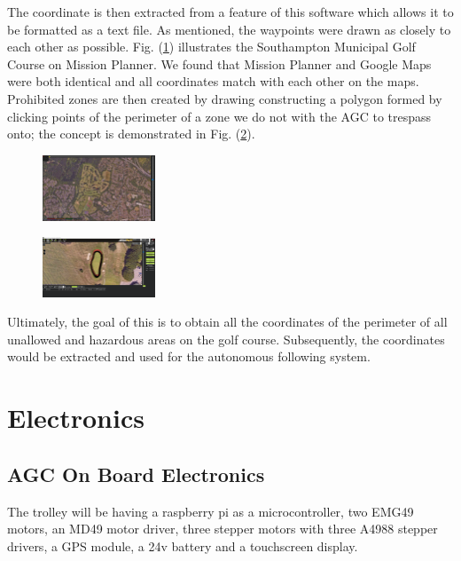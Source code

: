 \documentclass[11pt,landscape]{article}
\begin{document}
\begin{multicols}{3}
The coordinate is then extracted from a feature of this software which allows it
to be formatted as a text file. As mentioned, the waypoints were drawn as
closely to each other as possible. Fig. (\ref{fig:mission_planner}) illustrates
the Southampton Municipal Golf Course on Mission Planner. We found that Mission
Planner and Google Maps were both identical and all coordinates match with
each other on the maps. Prohibited zones are then created by drawing
constructing a polygon formed by clicking points of the perimeter of a zone we
do not with the AGC to trespass onto; the concept is demonstrated in Fig.
(\ref{fig:polygon1}).

\begin{figure}[H]
    \begin{center}
        \includegraphics[width=0.3\textwidth]{Municipal.png}
    \end{center}
    \label{fig:mission_planner}
\end{figure}

\begin{figure}[H]
    \begin{center}
        \includegraphics[width=0.3\textwidth]{polygon 1.png}
    \end{center}
    \label{fig:polygon1}
\end{figure}

Ultimately, the goal of this is to obtain all the coordinates of the perimeter
of all unallowed and hazardous areas on the golf course. Subsequently, the
coordinates would be extracted and used for the autonomous following system.


\section{Electronics}
\label{electronics}
\subsection{AGC On Board Electronics}
The trolley will be having a raspberry pi as a microcontroller, two EMG49
motors, an MD49 motor driver, three stepper motors with three A4988 stepper
drivers, a GPS module, a 24v battery and a touchscreen display.


\end{multicols}
\end{document}
